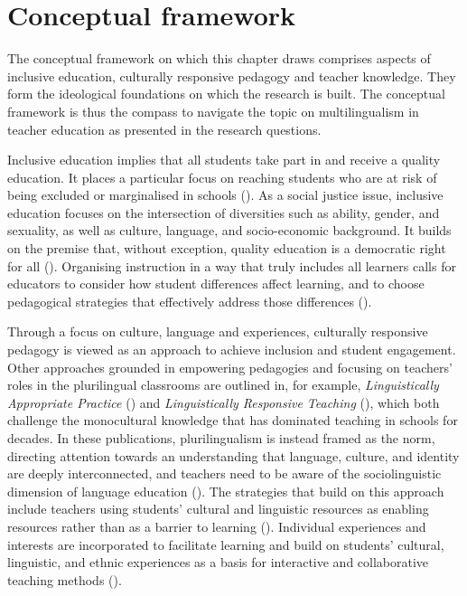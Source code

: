\documentclass[output=paper]{langscibook}
\begin{document}
\section{Conceptual framework}  %

The conceptual framework on which this chapter draws comprises aspects of inclusive education, culturally responsive pedagogy and teacher knowledge. They form the ideological foundations on which the research is built. The conceptual framework is thus the compass to navigate the topic on multilingualism in teacher education as presented in the research questions.

Inclusive education implies that all students take part in and receive a quality education. It places a particular focus on reaching students who are at risk of being excluded or marginalised in schools (\citealt{Black-Hawkins2017,Florian2009}). As a social justice issue, inclusive education focuses on the intersection of diversities such as ability, gender, and sexuality, as well as culture, language, and socio-economic background. It builds on the premise that, without exception, quality education is a democratic right for all (\citealt{Pantic2015-1,Reay2012}). Organising instruction in a way that truly includes all learners calls for educators to consider how student differences affect learning, and to choose pedagogical strategies that effectively address those differences (\citealt{KieranAnderson2019}).

Through a focus on culture, language and experiences, culturally responsive pedagogy is viewed as an approach to achieve inclusion and student engagement. Other approaches grounded in empowering pedagogies and focusing on teachers’ roles in the plurilingual classrooms are outlined in, for example, \textit{Linguistically Appropriate Practice} (\citealt{Chumak-Horbatsch2012}) and \textit{Linguistically Responsive Teaching} (\citealt{LucasEtAl2008,LucasVillegas2013}), which both challenge the monocultural knowledge that has dominated teaching in schools for decades. In these publications, plurilingualism is instead framed as the norm, directing attention towards an understanding that language, culture, and identity are deeply interconnected, and teachers need to be aware of the sociolinguistic dimension of language education (\citealt{LucasVillegas2013}). The strategies that build on this approach include teachers using students’ cultural and linguistic resources as enabling resources rather than as a barrier to learning (\citealt{LefeverEtAl2018}). Individual experiences and interests are incorporated to facilitate learning and build on students’ cultural, linguistic, and ethnic experiences as a basis for interactive and collaborative teaching methods (\citealt{Chumak-Horbatsch2012}).
\end{document}

